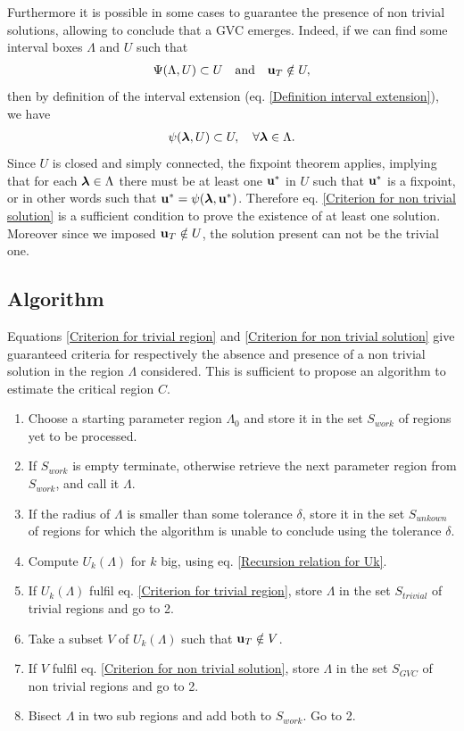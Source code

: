 \documentclass[
11pt, %
english, %
singlespacing, %
nolistspacing, %
liststotoc, %
headsepline, %
]{MastersDoctoralThesis} %
\begin{document}
Furthermore it is possible in some cases to guarantee the presence of non trivial solutions, allowing to conclude that a GVC emerges. Indeed, if we can find some interval boxes $\Lambda$ and $U$ such that
\begin{align}
	\Psi(\Lambda, U) \subset U \quad \text{and} \quad \boldsymbol{\mathrm{u}}_T \notin U, \label{Criterion for non trivial solution}
\end{align}
then by definition of the interval extension (eq. \eqref{Definition interval extension}), we have
\begin{align}
	\psi(\boldsymbol{\mathrm{\lambda}}, U) \subset U, \quad \forall \boldsymbol{\mathrm{\lambda}} \in \Lambda.
\end{align}
Since $U$ is closed and simply connected, the fixpoint theorem \missingref{} applies, implying that for each $\boldsymbol{\mathrm{\lambda}} \in \Lambda$ there must be at least one $\boldsymbol{\mathrm{u}}^*$ in $U$ such that $\boldsymbol{\mathrm{u}}^*$ is a fixpoint, or in other words such that $\boldsymbol{\mathrm{u}}^* = \psi(\boldsymbol{\mathrm{\lambda}}, \boldsymbol{\mathrm{u}}^*)$. Therefore eq. \eqref{Criterion for non trivial solution} is a sufficient condition to prove the existence of at least one solution. Moreover since we imposed $\boldsymbol{\mathrm{u}}_T \notin U$, the solution present can not be the trivial one.

\subsection{Algorithm}

Equations \eqref{Criterion for trivial region} and \eqref{Criterion for non trivial solution} give guaranteed criteria for respectively the absence and presence of a non trivial solution in the region $\Lambda$ considered. This is sufficient to propose an algorithm to estimate the critical region $C$.

\begin{enumerate}
	\item Choose a starting parameter region $\Lambda_0$ and store it in the set $S_{work}$ of regions yet to be processed.
	\item If $S_{work}$ is empty terminate, otherwise retrieve the next parameter region from $S_{work}$, and call it $\Lambda$.
	\item If the radius of $\Lambda$ is smaller than some tolerance $\delta$, store it in the set $S_{unkown}$ of regions for which the algorithm is unable to conclude using the tolerance $\delta$.
	\item Compute $U_k(\Lambda)$ for $k$ big, using eq. \eqref{Recursion relation for Uk}.
	\item If $U_k(\Lambda)$ fulfil eq. \eqref{Criterion for trivial region}, store $\Lambda$ in the set $S_{trivial}$ of trivial regions and go to 2.
	\item Take a subset $V$ of $U_k(\Lambda)$ such that $\boldsymbol{\mathrm{u}}_T \notin V$.
	\item If $V$ fulfil eq. \eqref{Criterion for non trivial solution}, store $\Lambda$ in the set $S_{GVC}$ of non trivial regions and go to 2.
	\item Bisect $\Lambda$ in two sub regions and add both to $S_{work}$. Go to 2.
\end{enumerate}
\end{document}

